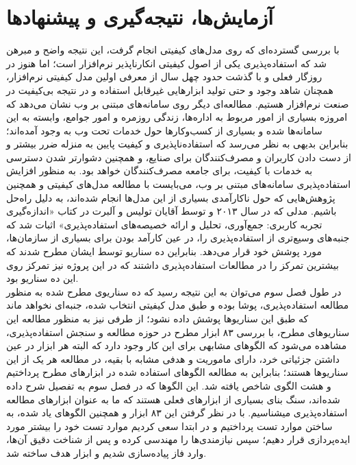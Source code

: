 \chapter{آزمایش‌ها، نتیجه‌گیری و پیشنهادها}
با بررسی گسترده‌ای که روی مدل‌های کیفیتی انجام گرفت، این نتیجه واضح و مبرهن شد که استفاده‌پذیری یکی از اصول کیفیتی انکارناپذیر نرم‌افزار است؛ اما هنوز در روزگار فعلی و با گذشت حدود چهل سال از معرفی اولین مدل کیفیتی نرم‌افزار، همچنان شاهد وجود و حتی تولید ابزارهایی غیرقابل استفاده و در نتیجه بی‌کیفیت در صنعت نرم‌افزار هستیم. مطالعه‌ای دیگر روی سامانه‌های مبتنی بر وب نشان می‌دهد که امروزه بسیاری از امور مربوط به اداره‌ها، زندگی روزمره و امور جوامع، وابسته به این سامانه‌ها شده و بسیاری از کسب‌وکارها حول خدمات تحت وب به وجود آمده‌اند؛ بنابراین بدیهی به نظر می‌رسد که استفاده‌ناپذیری و کیفیت پایین به منزله ضرر بیشتر و از دست دادن کاربران و مصرف‌کنندگان برای صنایع، و همچنین دشوارتر شدن دسترسی به خدمات با کیفیت، برای جامعه مصرف‌کنندگان خواهد بود. به منظور افزایش استفاده‌پذیری سامانه‌های مبتنی بر وب، می‌بایست با مطالعه مدل‌های کیفیتی و همچنین پژوهش‌هایی که حول ناکارآمدی بسیاری از این مدل‌ها انجام شده‌اند، به دلیل راه‌حل باشیم. مدلی که در سال ۲۰۱۳ و توسط آقایان تولیس و آلبرت در کتاب «اندازه‌گیری تجربه کاربری: جمع‌آوری، تحلیل و ارائه خصیصه‌های استفاده‌پذیری»
\cite{albert_measuring_2013}
اثبات شد که جنبه‌های وسیع‌تری از استفاده‌پذیری را، در عین کارآمد بودن برای بسیاری از سازمان‌ها، مورد پوشش خود قرار می‌دهد. بنابراین ده سناریو توسط ایشان مطرح شدند که بیشترین تمرکز را در مطالعات استفاده‌پذیری داشتند که در این پروژه نیز تمرکز روی این ده سناریو بود.\\
در طول فصل سوم می‌توان به این نتیجه رسید که ده سناریوی مطرح شده به منظور مطالعه استفاده‌پذیری، پوشا بوده و طبق مدل کیفیتی انتخاب شده، جنبه‌ای نخواهد ماند که طبق این سناریوها پوشش داده نشود؛ از طرفی نیز به منظور مطالعه این سناریوهای مطرح، با بررسی ۸۳ ابزار مطرح در حوزه مطالعه و سنجش استفاده‌پذیری، مشاهده می‌شود که الگوهای مشابهی برای این کار وجود دارد که البته هر ابزار در عین داشتن جزئیاتی خرد، دارای ماموریت و هدفی مشابه با بقیه‌، در مطالعه هر یک از این سناریوها هستند؛ بنابراین به مطالعه الگوهای استفاده شده در ابزارهای مطرح پرداختیم و هشت الگوی شاخص
یافته شد. این الگوها که در فصل سوم به تفصیل شرح داده شده‌اند، سنگ بنای بسیاری از ابزارهای فعلی هستند که ما به عنوان ابزارهای مطالعه استفاده‌پذیری میشناسیم. با در نظر گرفتن این ۸۳ ابزار و همچنین الگوهای یاد شده، به ساختن موارد تست پرداختیم و در ابتدا سعی کردیم موارد تست خود را بیشتر مورد ایده‌پردازی قرار دهیم؛ سپس نیازمندی‌ها را مهندسی کرده و پس از شناخت دقیق آن‌ها، وارد فاز پیاده‌سازی شدیم و ابزار هدف ساخته شد.
